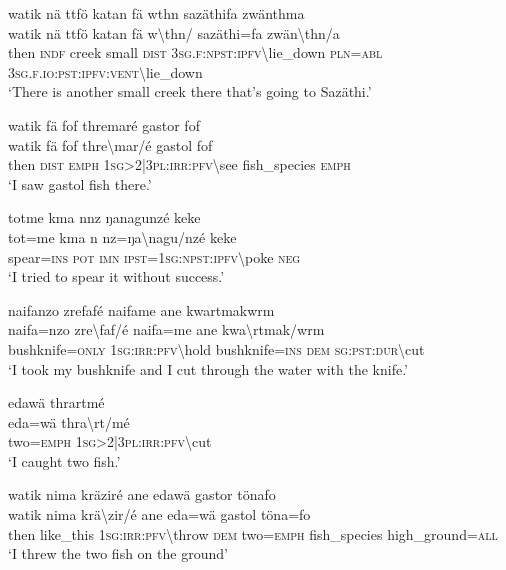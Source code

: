 \ea\label{ex:13:a1345}
watik nä ttfö katan fä wthn sazäthifa zwänthma\\
\gll watik	nä	ttfö	katan	fä	w{\textbackslash}thn/	sazäthi=fa	zwän{\textbackslash}thn/a\\
     then	\textsc{indf}	creek	small	\textsc{dist}	3\textsc{sg}.\textsc{f}:\textsc{npst}:\textsc{ipfv}{\textbackslash}lie\_down	\textsc{pln}=\textsc{abl}	3\textsc{sg}.\textsc{f}.\textsc{io}:\textsc{pst}:\textsc{ipfv}:\textsc{vent}{\textbackslash}lie\_down\\
\glt `There is another small creek there that's going to Sazäthi.'
\z

\ea\label{ex:13:a1346}
watik fä fof thremaré gastor fof\\
\gll watik	fä	fof	thre{\textbackslash}mar/é	gastol	fof\\
     then	\textsc{dist}	\textsc{emph}	1\textsc{sg}>2|3\textsc{pl}:\textsc{irr}:\textsc{pfv}{\textbackslash}see	fish\_species	\textsc{emph}\\
\glt `I saw gastol fish there.'
\z

\ea\label{ex:13:a1347}
totme kma nnz ŋanagunzé keke\\
\gll tot=me	kma	n	nz=ŋa{\textbackslash}nagu/nzé	keke\\
     spear=\textsc{ins}	\textsc{pot}	\textsc{imn}	\textsc{ipst}=1\textsc{sg}:\textsc{npst}:\textsc{ipfv}{\textbackslash}poke	\textsc{neg}\\
\glt `I tried to spear it without success.'
\z

\ea\label{ex:13:a1348}
naifanzo zrefafé naifame ane  kwartmakwrm\\
\gll naifa=nzo	zre{\textbackslash}faf/é	naifa=me	ane	kwa{\textbackslash}rtmak/wrm\\
     bushknife=\textsc{only}	1\textsc{sg}:\textsc{irr}:\textsc{pfv}{\textbackslash}hold	bushknife=\textsc{ins}	\textsc{dem}	\textsc{sg}:\textsc{pst}:\textsc{dur}{\textbackslash}cut\\
\glt `I took my bushknife and I cut through the water with the knife.'
\z

\ea\label{ex:13:a4931}
edawä thrartmé\\
\gll eda=wä	thra{\textbackslash}rt/mé\\
     two=\textsc{emph}	1\textsc{sg}>2|3\textsc{pl}:\textsc{irr}:\textsc{pfv}{\textbackslash}cut\\
\glt `I caught two fish.'
\z

\ea\label{ex:13:a1350}
watik nima kräziré ane edawä gastor tönafo\\
\gll watik	nima	krä{\textbackslash}zir/é	ane	eda=wä	gastol	töna=fo\\
     then	like\_this	1\textsc{sg}:\textsc{irr}:\textsc{pfv}{\textbackslash}throw	\textsc{dem}	two=\textsc{emph}	fish\_species	high\_ground=\textsc{all}\\
\glt `I threw the two fish on the ground'
\z


